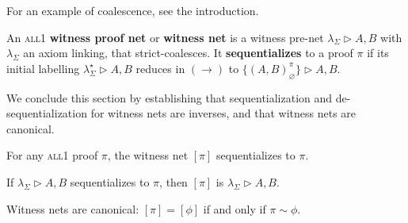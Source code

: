\documentclass[a4paper,UKenglish]{lipics-v2019}
\newcommand\defn[1]{\textbf{#1}}
\newcommand\all{\textsc{all}}
\newcommand\+{+}
\renewcommand\*{\times}
\newcommand\net[3]{#1\triangleright #2,#3}
\newcommand\link[3][\sigma]{(#2,#3)_{#1}}
\newcommand\scoal{\rightarrow} %
\begin{document}

For an example of coalescence, see the introduction.


\begin{definition}
An \all{\textnormal 1} \defn{witness proof net} or \defn{witness net} is a witness pre-net $\net{\lambda_\Sigma}AB$ with $\lambda_\Sigma$ an axiom linking, that strict-coalesces. It \defn{sequentializes} to a proof $\pi$ if its initial labelling $\net{\lambda_\Sigma^\star}AB$ reduces in $(\scoal)$ to $\net{\{\link[\varnothing]AB^\pi\}}AB$.
\end{definition}


We conclude this section by establishing that sequentialization and de-sequentialization for witness nets are inverses, and that witness nets are canonical.


\begin{theorem}
\label{thm:proof->net->proof}
For any \all{\textnormal 1} proof $\pi$, the witness net $[\pi]$ sequentializes to $\pi$. 
\end{theorem}


\begin{theorem}
\label{thm:net->proof->net}
If $\net{\lambda_\Sigma}AB$ sequentializes to $\pi$, then $[\pi]$ is $\net{\lambda_\Sigma}AB$. 
\end{theorem}


\begin{theorem}
\label{thm:canonical}
Witness nets are canonical: $[\pi]=[\phi]$ if and only if $\pi\sim\phi$.
\end{theorem}
\end{document}
